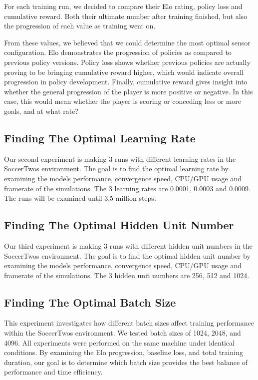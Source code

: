 \documentclass{LSkill}
\begin{document}
For each training run, we decided to compare their Elo rating, policy loss and cumulative reward. Both their ultimate number after training finished, but also the progression of each value as training went on. 

From these values, we believed that we could determine the most optimal sensor configuration. Elo demonstrates the progression of policies as compared to previous policy versions.
Policy loss shows whether previous policies are actually proving to be bringing cumulative reward higher, which would indicate overall progression in policy development. Finally, cumulative reward gives insight into whether the general progression of the player is more positive or negative. In this case, this would mean whether the player is scoring or conceding less or more goals, and at what rate?

\subsection{Finding The Optimal Learning Rate}
Our second experiment is making 3 runs with different learning rates in the SoccerTwos environment. The goal is to find the optimal learning rate by examining the models performance, convergence speed, CPU/GPU usage and framerate of the simulations. The 3 learning rates are 0.0001, 0.0003 and 0.0009. The runs will be examined until 3.5 million steps.

\subsection{ Finding The Optimal Hidden Unit Number}
Our third experiment is making 3 runs with different hidden unit numbers in the SoccerTwos environment. The goal is to find the optimal hidden unit number by examining the models performance, convergence speed, CPU/GPU usage and framerate of the simulations. The 3 hidden unit numbers are 256, 512 and 1024.

\subsection{Finding The Optimal Batch Size}
\label{subsec:batchsize-exp}
This experiment investigates how different batch sizes affect training performance within the SoccerTwos environment. We tested batch sizes of 1024, 2048, and 4096. All experiments were performed on the same machine under identical conditions. By examining the Elo progression, baseline loss, and total training duration, our goal is to determine which batch size provides the best balance of performance and time efficiency.
\end{document}
